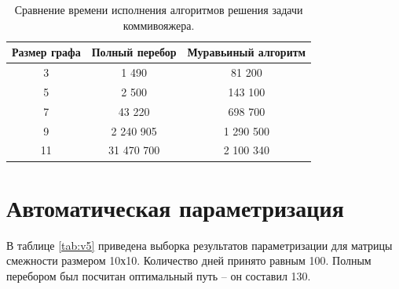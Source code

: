 \documentclass[12pt]{report}
\begin{document}
\begin{table}[H]

	\begin{center}

		\begin{tabular}{|c|c|c|}

			\hline

			Размер графа & Полный перебор & Муравьиный алгоритм \\

			\hline
			3 & 1 490 & 81 200 \\ 
			5 & 2 500 & 143 100 \\
			7 & 43 220 & 698 700 \\ 
			9 & 2 240 905 & 1 290 500 \\
			11 & 31 470 700 & 2 100 340 \\
			\hline

		\end{tabular}

	\end{center}

	\caption{Сравнение времени исполнения алгоритмов решения задачи коммивояжера.}

	\label{tab:timing}

\end{table}

\section{Автоматическая параметризация}

В таблице \ref{tab:v5} приведена выборка результатов параметризации для матрицы смежности размером 10х10. Количество дней принято равным 100. Полным перебором был посчитан оптимальный путь -- он составил 130.
\end{document}
